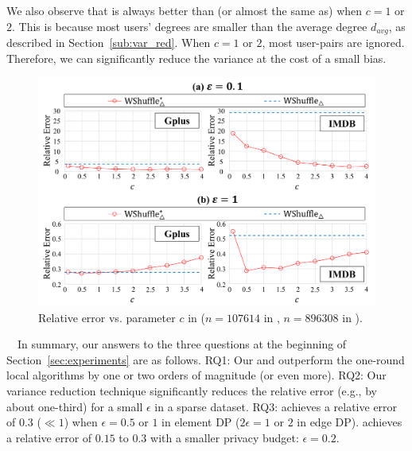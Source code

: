 We also observe that \AlgWSTriVR{} is always better than (or almost the same as) \AlgWSTri{} when $c=1$ or $2$. 
This is because most users' degrees are smaller than the average degree $d_{avg}$, as described in Section~\ref{sub:var_red}. 
When $c=1$ or $2$, most user-pairs are ignored. 
Therefore, we can significantly reduce the variance at the cost of a small bias. 

\begin{figure}[t]
  \centering
  \includegraphics[width=0.99\linewidth]{fig/res4_thr.pdf}
  \vspace{-4mm}
  \caption{Relative error vs. parameter $c$ in \AlgWSTriVR{} ($n=107614$ in \Gplus{}, $n=896308$ in \IMDB{}).
  }
  \label{fig:res4_thr}
\end{figure}

\smallskip
{}~~In summary, our answers to the three questions at the beginning of Section~\ref{sec:experiments} are as follows. 
RQ1: Our \AlgWSTriVR{} and \AlgWSCyc{} outperform the one-round local algorithms by one or two orders of magnitude (or even more). 
RQ2: Our variance reduction technique significantly reduces the relative error (e.g., by about one-third) 
for a small $\epsilon$ in a sparse dataset. 
RQ3: 
\AlgWSTriVR{} achieves a relative error of $0.3$ ($\ll 1$) when $\epsilon=0.5$ or $1$ in element DP ($2\epsilon=1$ or $2$ in edge DP). 
\AlgWSCyc{} achieves a relative error of $0.15$ to $0.3$ with a smaller privacy budget: $\epsilon=0.2$. 
